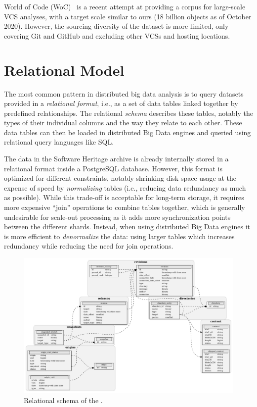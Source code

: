 World of Code (WoC)~\cite{mockus2019woc} is a recent attempt at providing a
corpus for large-scale VCS analyses, with a target scale similar to ours (18
billion objects as of October 2020). However, the sourcing diversity of the
dataset is more limited, only covering Git and GitHub and excluding other
\glspl{VCS} and hosting locations.

\section{Relational Model}%
\label{sec:relational-model}

The most common pattern in distributed big data analysis is to query datasets
provided in a \emph{relational format}, i.e., as a set of data tables linked
together by predefined relationships. The relational \emph{schema} describes
these tables, notably the types of their individual columns and the way they
relate to each other. These data tables can then be loaded in distributed Big
Data engines and queried using relational query languages like SQL.

The data in the Software Heritage archive is already internally stored in a
relational format inside a PostgreSQL database. However, this format is
optimized for different constraints, notably shrinking disk space usage at the
expense of speed by \emph{normalizing} tables (i.e., reducing data redundancy
as much as possible). While this trade-off is acceptable for long-term storage,
it requires more expensive ``join'' operations to combine tables together,
which is generally undesirable for scale-out processing as it adds more
synchronization points between the different shards. Instead, when using
distributed Big Data engines it is more efficient to \emph{denormalize} the
data: using larger tables which increases redundancy while reducing the need
for join operations.

\begin{figure}
    \includegraphics[width=\linewidth]{img/graph-dataset/db-schema}
    \caption{Relational schema of the \SWHGD{}.}%
    \label{fig:swh-dataset-schema}
\end{figure}

